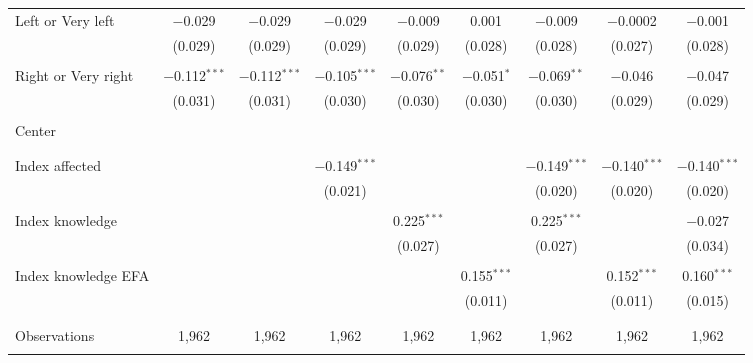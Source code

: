\begin{tabular}{@{\extracolsep{5pt}}lcccccccc}
 Left or Very left & $-$0.029 & $-$0.029 & $-$0.029 & $-$0.009 & 0.001 & $-$0.009 & $-$0.0002 & $-$0.001 \\ 
  & (0.029) & (0.029) & (0.029) & (0.029) & (0.028) & (0.028) & (0.027) & (0.028) \\ 
  & & & & & & & & \\ 
 Right or Very right & $-$0.112$^{***}$ & $-$0.112$^{***}$ & $-$0.105$^{***}$ & $-$0.076$^{**}$ & $-$0.051$^{*}$ & $-$0.069$^{**}$ & $-$0.046 & $-$0.047 \\ 
  & (0.031) & (0.031) & (0.030) & (0.030) & (0.030) & (0.030) & (0.029) & (0.029) \\ 
  & & & & & & & & \\ 
 Center &  &  &  &  &  &  &  &  \\ 
  &  &  &  &  &  &  &  &  \\ 
  & & & & & & & & \\ 
 Index affected &  &  & $-$0.149$^{***}$ &  &  & $-$0.149$^{***}$ & $-$0.140$^{***}$ & $-$0.140$^{***}$ \\ 
  &  &  & (0.021) &  &  & (0.020) & (0.020) & (0.020) \\ 
  & & & & & & & & \\ 
 Index knowledge &  &  &  & 0.225$^{***}$ &  & 0.225$^{***}$ &  & $-$0.027 \\ 
  &  &  &  & (0.027) &  & (0.027) &  & (0.034) \\ 
  & & & & & & & & \\ 
 Index knowledge EFA &  &  &  &  & 0.155$^{***}$ &  & 0.152$^{***}$ & 0.160$^{***}$ \\ 
  &  &  &  &  & (0.011) &  & (0.011) & (0.015) \\ 
  & & & & & & & & \\ 
\hline \\[-1.8ex] 

Observations & 1,962 & 1,962 & 1,962 & 1,962 & 1,962 & 1,962 & 1,962 & 1,962 \\ 
\hline 
\hline \\[-1.8ex] 
\end{tabular} 